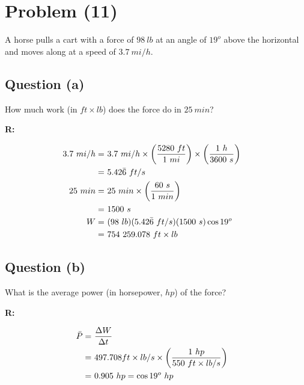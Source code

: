 \section{Problem (11)}
	A horse pulls a cart with a force of $98 \ lb$ at an angle of $19^{o}$ above the horizontal and moves along at a speed of $3.7 \ mi/h$.

	\subsection{Question (a)}

		How much work (in $ft \times lb$) does the force do in $25 \ min$?

		\textbf{R:}

		\begin{align}
			3.7 \ mi/h = \ & 3.7 \ mi/h
			\times \left( \frac{5280 \ ft}{1 \ mi} \right)
			\times \left( \frac{1 \ h}{3600 \ s} \right)
			& \notag \\
			= \ &5.42\bar{6} \ ft/s& \notag \\
			25 \ min = \ & 25 \ min
			\times \left( \frac{60 \ s}{1 \ min} \right)
			& \notag \\
			= \ &1500 \ s& \notag \\
			W = \ &(98 \ lb)(5.42\bar{6} \ ft/s)(1500 \ s) \cos 19^{o}& \notag \\
			= \ &754 \ 259.078 \ ft \times lb&
		\end{align}

	\subsection{Question (b)}

		What is the average power (in horsepower, $hp$) of the force?

		\textbf{R:}

		\begin{align}
			\bar{P} = \ &\frac{\Delta W}{\Delta t}& \notag \\
			= \ &497.708 ft \times lb/s
			\times \left( \frac{1 \ hp}{550 \ ft \times lb/s} \right)
			& \notag \\
			= \ &0.905 \ hp = \cos 19^{o} \ hp&
		\end{align}
